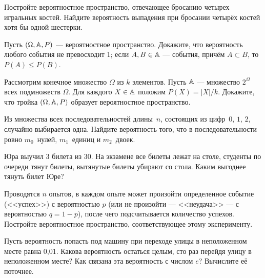 \documentclass[a4paper,12pt]{article}
\begin{document}
     Постройте вероятностное пространство, отвечающее бросанию четырех игральных костей.
     Найдите вероятность выпадения при бросании четырёх костей хотя бы одной шестерки.

    Пусть $(\Omega ,\mathbb{A}, P)$ --- вероятностное пространство.
    Докажите, что
        вероятность любого события не превосходит 1;
        если $A, B\in\mathbb{A}$ --- события, причём $A\subset B$, то $P(A)\le P(B)$.

    Рассмотрим %
    конечное множество $\Omega $ из $k$ элементов.
    Пусть $\mathbb{A}$ --- множество $2^\Omega$ всех подмножеств $\Omega$.
    Для каждого $X\in\mathbb{A}$ положим $P(X)=|X|/k$.
    Докажите, что тройка $(\Omega ,\mathbb{A}, P)$ образует вероятностное пространство.


    Из множества всех последовательностей длины~$n$, состоящих из цифр~$0,\,1,\,2$, случайно выбирается одна.
    Найдите вероятность того, что в последовательности ровно $m_0$~нулей, $m_1$~единиц и $m_2$~двоек.



Юра выучил 3 билета из 30. На экзамене все билеты
лежат на столе, студенты
по очереди тянут билеты, вытянутые билеты убирают со стола.
Каким выгоднее тянуть билет Юре? %



    Проводятся $n$ опытов, в каждом опыте может произойти определенное событие (<<успех>>) с вероятностью $p$ (или не произойти --- <<неудача>> --- с вероятностью $q=1-p$), после чего подсчитывается количество успехов.
    Постройте вероятностное пространство, соответствующее этому эксперименту.




 Пусть вероятность попасть под машину при переходе улицы в неположенном
месте равна 0,01. Какова вероятность остаться целым, сто раз
перейдя улицу в неположенном месте?
 Как связана эта вероятность с числом $e$?
Вычислите её поточнее.
\end{document}
